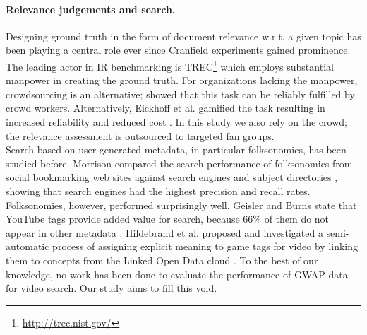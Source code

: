 \paragraph{Relevance judgements and search.}Designing ground truth in the form of document relevance w.r.t. a given topic has been playing a central role ever since Cranfield experiments gained prominence\cite{vorhees}. The leading actor in IR benchmarking is TREC\footnote{\url{http://trec.nist.gov/}} which employs substantial manpower in creating the ground truth. For organizations lacking the manpower, crowdsourcing is an alternative; \cite{rjturk1,rjturk2} showed that this task can be reliably fulfilled by crowd workers. Alternatively, Eickhoff et al. gamified the task resulting in increased reliability and reduced cost \cite{rjgame}. In this study we also rely on the crowd; the relevance assessment is outsourced to targeted fan groups.\\
Search based on user-generated metadata, in particular folksonomies, has been studied before. Morrison compared the search performance of folksonomies from social bookmarking web sites against search engines and subject directories \cite{morison}, showing that search engines had the highest precision and recall rates. Folksonomies, however, performed surprisingly well. Geisler and Burns state that YouTube tags provide added value for search, because 66\% of them do not appear in  other metadata \cite{youtube}. Hildebrand et al. proposed and investigated a semi-automatic process of assigning explicit meaning to game tags for video by linking them to concepts from the Linked Open Data cloud \cite{michiel}. To the best of our knowledge, no work has been done to evaluate the performance of GWAP data for video search. Our study aims to fill this void.

